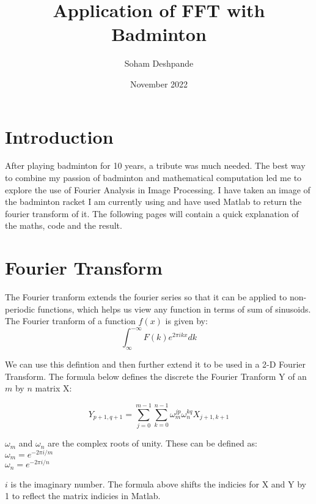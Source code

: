 \documentclass{article}
\title{Application of FFT with Badminton}
\author{Soham Deshpande}
\date{November 2022}
\begin{document}
\maketitle
\clearpage
\tableofcontents
\clearpage

\section{Introduction}

After playing badminton for 10 years, a tribute was much needed. The best way
to combine my passion of badminton and mathematical computation led me to explore
the use of Fourier Analysis in Image Processing. I have taken an image of the badminton
racket I am currently using and have used Matlab to return the fourier transform
of it. The following pages will contain a quick explanation of the maths, code
and the result.
\clearpage


\section{Fourier Transform}

The Fourier tranform extends the fourier series so that it can be applied to non-periodic
functions, which helps us view any function in terms of sum of sinusoids.
\\
The Fourier tranform of a function $f(x)$ is given by:
\begin{equation}
    \int_{\infty}^{-\infty}F(k)e^{2\pi ikx}dk
\end{equation}

We can use this defintion and then further extend it to be used in a 2-D Fourier
Transform. The formula below defines the discrete the Fourier Tranform Y of
an $m$ by $n$ matrix X:

\begin{equation}
    Y_{p+1,q+1} = \sum^{m-1}_{j=0}\sum_{k=0}^{n-1}\omega^{jp}_m\omega_{n}^{kq}X_{j+1,k+1}

\end{equation}

$\omega_m$ and $\omega_n$ are the complex roots of unity. These can be defined as:
\\
$\omega_m = e^{-2 \pi i/m}$
\\$\omega_n = e^{-2 \pi i/n}$

$i$ is the imaginary number. The formula above shifts the indicies for X and Y by 1
to reflect the matrix indicies in Matlab.
\\
\\
\end{document}
